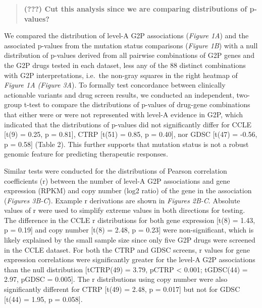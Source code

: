 \documentclass[man,floatsintext]{apa6}
\begin{document}
\begin{quote}
\textbf{(???) Cut this analysis since we are comparing distributions of
p-values?}
\end{quote}

We compared the distribution of level-A G2P associations (\emph{Figure
1A}) and the associated p-values from the mutation status comparisons
(\emph{Figure 1B}) with a null distribution of p-values derived from all
pairwise combinations of G2P genes and the G2P drugs tested in each
dataset, less any of the 88 distinct combinations with G2P
interpretations, i.e.~the non-gray squares in the right heatmap of
\emph{Figure 1A (Figure 3A}). To formally test concordance between
clinically actionable variants and drug screen results, we conducted an
independent, two-group t-test to compare the distributions of p-values
of drug-gene combinations that either were or were not represented with
level-A evidence in G2P, which indicated that the distributions of
p-values did not significantly differ for CCLE {[}t(9) = 0.25, p =
0.81{]}, CTRP {[}t(51) = 0.85, p = 0.40{]}, nor GDSC {[}t(47) = -0.56, p
= 0.58{]} (Table 2). This further supports that mutation status is not a
robust genomic feature for predicting therapeutic responses.

Similar tests were conducted for the distributions of Pearson
correlation coefficients (r) between the number of level-A G2P
associations and gene expression (RPKM) and copy number (log2 ratio) of
the gene in the association (\emph{Figures 3B-C}). Example r derivations
are shown in \emph{Figures 2B-C}. Absolute values of r were used to
simplify extreme values in both directions for testing. The difference
in the CCLE \textbar{}r\textbar{} distributions for both gene expression
{[}t(8) = 1.43, p = 0.19{]} and copy number {[}t(8) = 2.48, p = 0.23{]}
were non-significant, which is likely explained by the small sample size
since only five G2P drugs were screened in the CCLE dataset. For both
the CTRP and GDSC screens, \textbar{}r\textbar{} values for gene
expression correlations were significantly greater for the level-A G2P
associations than the null distribution {[}tCTRP(49) = 3.79, pCTRP
\textless{} 0.001; tGDSC(44) = 2.97, pGDSC = 0.005{]}. The
\textbar{}r\textbar{} distributions using copy number were also
significantly different for CTRP {[}t(49) = 2.48, p = 0.017{]} but not
for GDSC {[}t(44) = 1.95, p = 0.058{]}.
\end{document}
